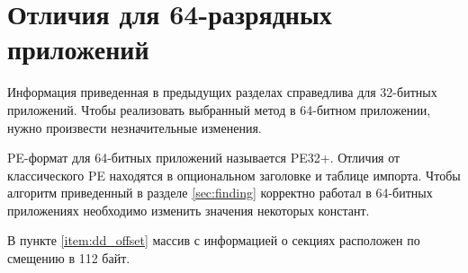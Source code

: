 
\section{Отличия для 64-разрядных приложений}
Информация приведенная в предыдущих разделах справедлива для 32-битных
приложений. Чтобы реализовать выбранный метод в 64-битном приложении, нужно
произвести незначительные изменения.

PE-формат для 64-битных приложений называется PE32+. Отличия от классического PE
находятся в опциональном заголовке и таблице импорта. Чтобы алгоритм приведенный
в разделе \ref{sec:finding} корректно работал в 64-битных приложениях необходимо
изменить значения некоторых констант. 

В пункте \ref{item:dd_offset} массив с информацией о секциях расположен по
смещению в 112 байт. 

